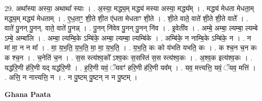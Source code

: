 \documentclass[17pt]{extarticle}
\begin{document}
29. अथा᳚स्या अस्या॒ अथाथा᳚ स्याः । . अ॒स्या॒ मद्ध्य॒म् मद्ध्य॑ मस्या अस्या॒ मद्ध्य᳚म् । . मद्ध्य॑ मेधता मेधता॒म् मद्ध्य॒म् मद्ध्य॑ मेधताम् । . ए॒ध॒ताꣳ॒॒ शी॒ते शी॒त ए॑धता मेधताꣳ शी॒ते । . शी॒ते वाते॒ वाते॑ शी॒ते शी॒ते वाते᳚ । . वाते॑ पु॒नन् पु॒नन्. वाते॒ वाते॑ पु॒नन्न् । . पु॒नन् नि॑वेव पु॒नन् पु॒नन् नि॑व । . इ॒वेती॑व । . अम्बे॒ अम्बा॒ ल्यम्बा॒ ल्यम्बे ऽम्बे॒ अम्बा॑लि । . अम्बा॒ ल्यम्बि॒के ऽम्बि॑के॒ अम्बा॒ ल्यम्बा॒ ल्यम्बि॑के । . अम्बि॑के॒ न नाम्बि॒के ऽम्बि॑के॒ न । . न मा॑ मा॒ न न मा᳚ । . मा॒ य॒भ॒ति॒ य॒भ॒ति॒ मा॒ मा॒ य॒भ॒ति॒ । . य॒भ॒ति॒ कः को य॑भति यभति॒ कः । . क श्च॒न च॒न कः क श्च॒न । . च॒नेति॑ च॒न । . स॒स स्त्य॑श्व॒को᳚ ऽश्व॒कः स॒सस्ति॑ स॒स स्त्य॑श्व॒कः । . अ॒श्व॒क इत्य॑श्व॒कः । . यद्ध॑रि॒णी ह॑रि॒णी यद् यद्ध॑रि॒णी । . ह॒रि॒णी यवं॒ ॅयवꣳ॑ हरि॒णी ह॑रि॒णी यव᳚म् । . यव॒ मत्त्यत्ति॒ यवं॒ ॅयव॒ मत्ति॑ । . अत्ति॒ न नात्त्यत्ति॒ न । . न पु॒ष्टम् पु॒ष्टन् न न पु॒ष्टम् । \newline

\textbf{Ghana Paata } \newline
\end{document}
